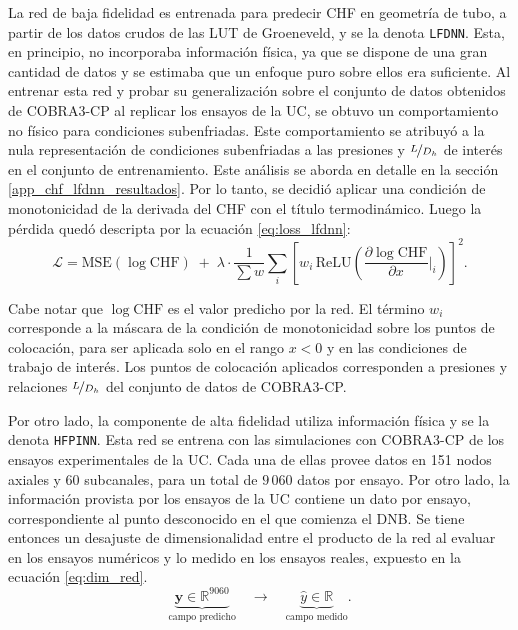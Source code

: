 La red de baja fidelidad es entrenada para predecir CHF en geometría de tubo, a partir de los datos crudos de las LUT de Groeneveld, y se la denota \texttt{LFDNN}. 
Esta, en principio, no incorporaba información física, ya que se dispone de una gran cantidad de datos y se estimaba que un enfoque puro sobre ellos era suficiente. Al entrenar esta red y probar su generalización sobre el conjunto de datos obtenidos de COBRA3-CP al replicar los ensayos de la UC, se obtuvo un comportamiento no físico para condiciones subenfriadas. Este comportamiento se atribuyó a la nula representación de condiciones subenfriadas a las presiones y $\nicefrac{L}{D_h}$ de interés en el conjunto de entrenamiento. Este análisis se aborda en detalle en la sección \ref{app_chf_lfdnn_resultados}. Por lo tanto, se decidió aplicar una condición de monotonicidad de la derivada del CHF con el título termodinámico. Luego la pérdida quedó descripta por la ecuación \ref{eq:loss_lfdnn}:
\begin{equation}
    \label{eq:loss_lfdnn}
    \mathcal{L} = \mathrm{MSE}(\log \mathrm{CHF}) \;+\; \lambda \cdot \frac{1}{\sum w}\sum_i \left[w_i\,\mathrm{ReLU}\!\left(\frac{\partial \log \mathrm{CHF}}{\partial x}\Big|_i\right)\right]^2 .
\end{equation}

Cabe notar que $\log\mathrm{CHF}$ es el valor predicho por la red. El término $w_i$ corresponde a la máscara de la condición de monotonicidad sobre los puntos de colocación, para ser aplicada solo en el rango $x<0$ y en las condiciones de trabajo de interés. Los puntos de colocación aplicados corresponden a presiones y relaciones $\nicefrac{L}{D_h}$ del conjunto de datos de COBRA3-CP.

Por otro lado, la componente de alta fidelidad utiliza información física y se la denota \texttt{HFPINN}. Esta red se entrena con las simulaciones con COBRA3-CP de los ensayos experimentales de la UC. Cada una de ellas provee datos en 151 nodos axiales y 60 subcanales, para un total de $9\,060$ datos por ensayo. Por otro lado, la información provista por los ensayos de la UC contiene un dato por ensayo, correspondiente al punto desconocido en el que comienza el DNB. Se tiene entonces un desajuste de dimensionalidad entre el producto de la red al evaluar en los ensayos numéricos y lo medido en los ensayos reales, expuesto en la ecuación \ref{eq:dim_red}.
\begin{equation}
    \underbrace{\mathbf{y} \in \mathbb{R}^{9060}}_{\text{campo predicho}}
    \quad\longrightarrow\quad
    \underbrace{\hat{y} \in \mathbb{R}}_{\text{campo medido}}.
    \label{eq:dim_red}
\end{equation}

